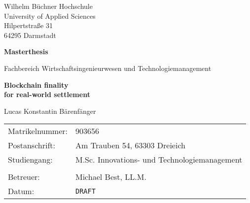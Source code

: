 \begin{titlepage}

	\large
	Wilhelm Büchner Hochschule \\
	University of Applied Sciences \\
	Hilpertstraße 31 \\
	64295 Darmstadt

	\vfill

	\begin{center}
		\Large
			\textbf{Masterthesis}

			\vspace{0.5cm}

			Fachbereich Wirtschaftsingenieurwesen und Technologiemanagement

			\vfill

		\Huge
			\textbf{
				Blockchain finality \\
				for real-world settlement
			}

			\vfill

		\Large
			Lucas Konstantin Bärenfänger
	\end{center}

	\vfill
	
	\begin{tabularx}{\textwidth}{@{}l X}
		Matrikelnummer: & 903656 \\
		Postanschrift:  & Am Trauben 54, 63303 Dreieich \\
		Studiengang:    & M.Sc. Innovations- und Technologiemanagement \\
        \\
		Betreuer:       & Michael Best, LL.M. \\
		Datum:          & \texttt{DRAFT}
	\end{tabularx}

\end{titlepage}
